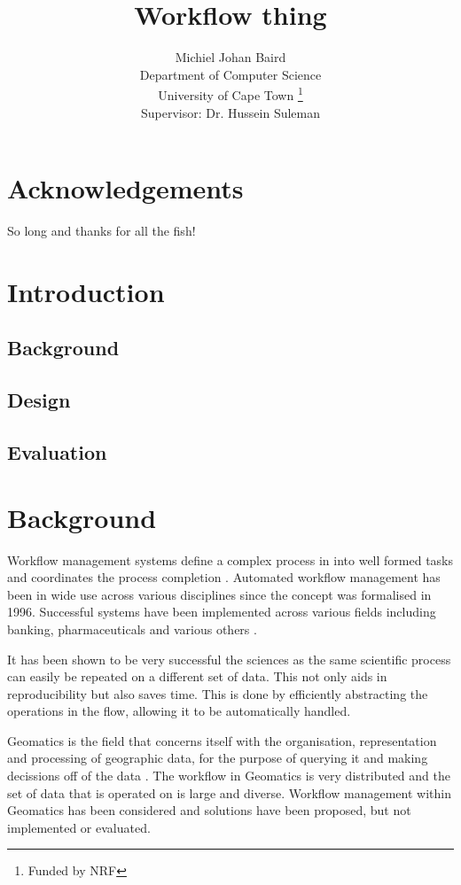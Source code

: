 \documentclass[12pt,a4paper]{report}
\title{Workflow thing}
\author{Michiel Johan Baird \\
        Department of Computer Science \\
        University of Cape Town
        \thanks{Funded by NRF}
    \\   \small{Supervisor: Dr. Hussein Suleman} }
\begin{document}

\tableofcontents
\newpage
\listoffigures
\newpage
\begin{abstract}

\end{abstract}
\chapter*{Acknowledgements}
So long and thanks for all the fish!
\chapter{Introduction}

    \section{Background}
    \section{Design}
    \section{Evaluation}
\chapter{Background}

    Workflow management systems define a complex process in into well formed
    tasks and coordinates the process completion \cite{1245778}.  Automated
    workflow management has been in wide use across various disciplines since
    the concept was formalised in 1996\cite{springerlink:10.1007/BF00136712}.
    Successful systems have been implemented across various fields including
    banking, pharmaceuticals and various others
    \cite{Brahe:2007:SWW:1316624.1316661,5407993}.

    It has been shown to be very successful the sciences as the same scientific
    process can easily be repeated on a different set of data\cite{4721191}.
    This not only aids in reproducibility but also saves time.  This is done by
    efficiently abstracting the operations in the flow, allowing it to be
    automatically handled.

    Geomatics is the field that concerns itself with the organisation,
    representation and processing of geographic data, for the purpose of
    querying it and making decissions off of the data
    \cite{DiMartino:2007:TAG:1341012.1341081}. The workflow in Geomatics is
    very distributed and the set of data that is operated on is large and
    diverse.  Workflow management within Geomatics has been considered and
    solutions have been proposed, but not implemented or
    evaluated\cite{Migliorini:2011:WTG:1999320.1999356}.
\end{document}
